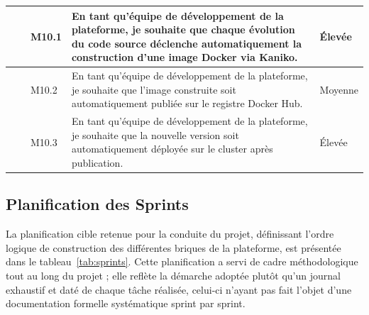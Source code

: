 {\begin{longtable}{|>{\centering\arraybackslash}m{0.8cm}|>{\centering\arraybackslash}m{2.6cm}|>{\centering\arraybackslash}m{1.1cm}|>{\raggedright\arraybackslash}p{6.1cm}|>{\centering\arraybackslash}m{2.3cm}|}
    \multirow{3}{*}{M10} & \multirow{3}{2.6cm}{\centering CI/CD}
     & M10.1 & En tant qu'équipe de développement de la plateforme, je souhaite que chaque évolution du code source déclenche automatiquement la construction d'une image Docker via Kaniko. & Élevée \\
    \cline{3-5}
     && M10.2 & En tant qu'équipe de développement de la plateforme, je souhaite que l'image construite soit automatiquement publiée sur le registre Docker Hub. & Moyenne \\
    \cline{3-5}
     && M10.3 & En tant qu'équipe de développement de la plateforme, je souhaite que la nouvelle version soit automatiquement déployée sur le cluster après publication. & Élevée \\
    \hline
    \end{longtable}
    }
    
    \subsection{Planification des Sprints}
    
    La planification cible retenue pour la conduite du projet, définissant l'ordre logique de construction des différentes briques de la plateforme, est présentée dans le tableau~\ref{tab:sprints}. Cette planification a servi de cadre méthodologique tout au long du projet ; elle reflète la démarche adoptée plutôt qu'un journal exhaustif et daté de chaque tâche réalisée, celui-ci n'ayant pas fait l'objet d'une documentation formelle systématique sprint par sprint.
    
